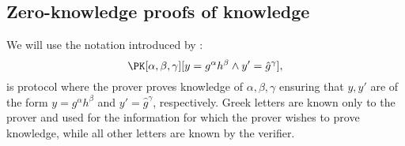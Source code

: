 \subsection{Zero-knowledge proofs of knowledge}%
\label{ZKPK}

We will use the notation introduced by \citet{PKnotation}:
\begin{equation}\label{PKexample}
  \PK[\alpha, \beta, \gamma][y = g^\alpha h^\beta \land y' = \hat g^\gamma],
\end{equation}
is  protocol where the prover proves knowledge of \(\alpha, \beta, 
\gamma\) ensuring that \(y, y'\) are of the form \(y = g^\alpha h^\beta\) and 
\(y' = \hat g^\gamma\), respectively.
Greek letters are known only to the prover and used for the information for which the prover wishes to prove knowledge, while all other letters are known by the verifier.



